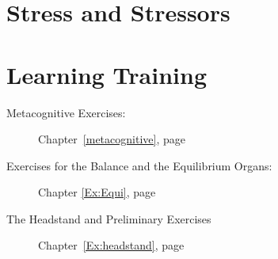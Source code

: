 \documentclass[../main.tex]{subfiles}
\begin{document}
%
\section{Stress and Stressors}

\section{Learning Training}
\begin{description}
\item[Metacognitive Exercises:] Chapter~\ref{metacognitive}, page~\pageref{metacognitive}
\item[Exercises for the Balance and the Equilibrium Organs:] Chapter \ref{Ex:Equi}, page~\pageref{Ex:Equi}
  \item[The Headstand and Preliminary Exercises] Chapter~\ref{Ex:headstand}, page~\pageref{Ex:headstand}
\end{description}
\end{document}
